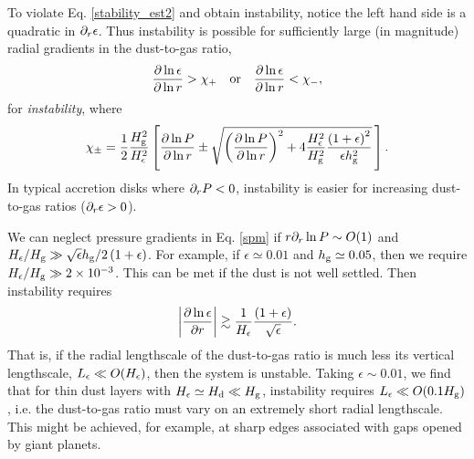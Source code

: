 
To violate Eq. \ref{stability_est2} and obtain instability, notice the 
left hand side is a quadratic in $\partial_r\epsilon$. Thus instability is possible for
sufficiently large (in magnitude) radial gradients  in the dust-to-gas
ratio,  
\begin{align}
  \frac{\partial\ln{\epsilon}}{\partial\ln{r}} > \chi_+ \quad \mathrm{or} \quad 
  \frac{\partial\ln{\epsilon}}{\partial\ln{r}} < \chi_-,
\end{align}
for \emph{instability}, where
\begin{align}\label{spm}
\chi_\pm = \frac{1}{2}\frac{H_\mathrm{g}^2}{H_\epsilon^2} 
  \left[
  \frac{\partial\ln{P}}{\partial\ln{r}} \pm 
  \sqrt{
  \left(\frac{\partial\ln{P}}{\partial\ln{r}}\right)^2 + 
  4 \frac{H_\epsilon^2}{H_\mathrm{g}^2}
  \frac{\left(1+\epsilon\right)^2}{\epsilon h_\mathrm{g}^2}
  }
  \,\right]. 
\end{align} 
In typical accretion disks where $\partial_rP<0$, instability is easier
for increasing dust-to-gas ratios ($\partial_r\epsilon > 0$).  

We can neglect pressure gradients in Eq. \ref{spm} 
if $r\partial_r\ln{P}\sim O(1)$ and $H_\epsilon/H_\mathrm{g}\gg
\sqrt{\epsilon}h_\mathrm{g}/2\left(1+\epsilon\right)$. For example, if $\epsilon\simeq 0.01$ and
$h_\mathrm{g}\simeq 0.05$, then we require $H_\epsilon/H_\mathrm{g}\gg
2\times10^{-3}$. This can be met if the dust is not well settled. 
Then instability requires 
\begin{align}\label{dust_edge}
\left|\frac{\partial\ln{\epsilon}}{\partial r}\right| \gtrsim
  \frac{1}{H_\epsilon}\frac{\left(1+\epsilon\right)}{\sqrt{\epsilon}}.
\end{align}
That is, if the radial lengthscale of the dust-to-gas ratio 
is much less its vertical lengthscale, $L_\epsilon\ll O(H_\epsilon)$, 
then the system is  unstable.  
Taking $\epsilon\sim 0.01$,  we find that 
for thin dust layers with $H_\epsilon \simeq H_\mathrm{d}\ll H_\mathrm{g}$,  instability
requires $L_\epsilon\ll O(0.1H_\mathrm{g})$, i.e. the dust-to-gas ratio must 
vary on an extremely short radial lengthscale. This might be achieved, for
example, at sharp edges associated with gaps opened by giant planets. 

